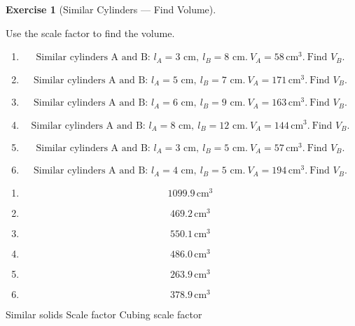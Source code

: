 \documentclass[
  letterpaper,
  DIV=11,
  numbers=noendperiod]{scrreprt}
\theoremstyle{definition}
\newtheorem{exercise}{Exercise}[chapter]
\theoremstyle{remark}
\begin{document}
\begin{exercise}[Similar Cylinders --- Find
Volume]\protect\hypertarget{exr-comp-12}{}\label{exr-comp-12}

Use the scale factor to find the volume.

\begin{enumerate}
\def\labelenumi{\alph{enumi})}
\item
  \[\text{Similar cylinders A and B: }l_A=3\text{ cm},\ l_B=8\text{ cm}.\ V_A=58\,\text{cm}^{3}.\ \text{Find }V_B.\]
\item
  \[\text{Similar cylinders A and B: }l_A=5\text{ cm},\ l_B=7\text{ cm}.\ V_A=171\,\text{cm}^{3}.\ \text{Find }V_B.\]
\item
  \[\text{Similar cylinders A and B: }l_A=6\text{ cm},\ l_B=9\text{ cm}.\ V_A=163\,\text{cm}^{3}.\ \text{Find }V_B.\]
\item
  \[\text{Similar cylinders A and B: }l_A=8\text{ cm},\ l_B=12\text{ cm}.\ V_A=144\,\text{cm}^{3}.\ \text{Find }V_B.\]
\item
  \[\text{Similar cylinders A and B: }l_A=3\text{ cm},\ l_B=5\text{ cm}.\ V_A=57\,\text{cm}^{3}.\ \text{Find }V_B.\]
\item
  \[\text{Similar cylinders A and B: }l_A=4\text{ cm},\ l_B=5\text{ cm}.\ V_A=194\,\text{cm}^{3}.\ \text{Find }V_B.\]
\end{enumerate}

\begin{tcolorbox}[enhanced jigsaw, opacitybacktitle=0.6, coltitle=black, arc=.35mm, colframe=quarto-callout-tip-color-frame, colback=white, bottomrule=.15mm, left=2mm, colbacktitle=quarto-callout-tip-color!10!white, titlerule=0mm, opacityback=0, title=\textcolor{quarto-callout-tip-color}{\faLightbulb}\hspace{0.5em}{🔍 View Solution}, leftrule=.75mm, breakable, rightrule=.15mm, bottomtitle=1mm, toptitle=1mm, toprule=.15mm]

\begin{enumerate}
\def\labelenumi{\alph{enumi})}
\item
  \[1099.9\,\text{cm}^{3}\]
\item
  \[469.2\,\text{cm}^{3}\]
\item
  \[550.1\,\text{cm}^{3}\]
\item
  \[486.0\,\text{cm}^{3}\]
\item
  \[263.9\,\text{cm}^{3}\]
\item
  \[378.9\,\text{cm}^{3}\]
\end{enumerate}

\end{tcolorbox}

{Similar solids} {Scale factor} {Cubing scale factor}

\end{exercise}
\end{document}
